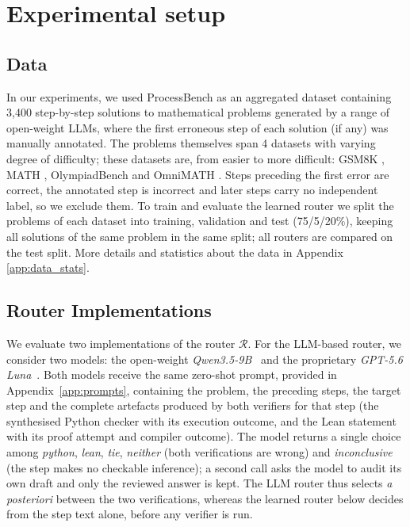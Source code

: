 \section{Experimental setup}
\label{sec:setup}

\subsection{Data}
In our experiments, we used ProcessBench \cite{processbench} as an aggregated dataset containing 3,400 step-by-step solutions to mathematical problems generated by a range of open-weight LLMs, where the first erroneous step of each solution (if any) was manually annotated. The problems themselves span 4 datasets with varying degree of difficulty; these datasets are, from easier to more difficult: GSM8K \cite{gsm8k}, MATH \cite{math}, OlympiadBench \cite{olympiadbench2024} and OmniMATH \cite{Gao2024OmniMATHAU}.
Steps preceding the first error are correct, the annotated step is incorrect and later steps carry no independent label, so we exclude them. To train and evaluate the learned router we split the problems of each dataset into training, validation and test (75/5/20\%), keeping all solutions of the same problem in the same split; all routers are compared on the test split. More details and statistics about the data in Appendix \ref{app:data_stats}.

\subsection{Router Implementations}

We evaluate two implementations of the router $\mathcal{R}$. For the LLM-based router, we consider two models: the open-weight \textit{Qwen3.5-9B}~\cite{qwen3.5} and the proprietary \textit{GPT-5.6 Luna}~\cite{openai2026gpt56}. Both models receive the same zero-shot prompt, provided in Appendix~\ref{app:prompts}, containing the problem, the preceding steps, the target step and the complete artefacts produced by both verifiers for that step (the synthesised Python checker with its execution outcome, and the Lean statement with its proof attempt and compiler outcome). The model returns a single choice among \textit{python}, \textit{lean}, \textit{tie}, \textit{neither} (both verifications are wrong) and \textit{inconclusive} (the step makes no checkable inference); a second call asks the model to audit its own draft and only the reviewed answer is kept. The LLM router thus selects \emph{a posteriori} between the two verifications, whereas the learned router below decides from the step text alone, before any verifier is run.

